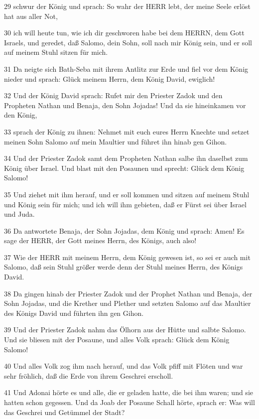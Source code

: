 \par 29 schwur der König und sprach: So wahr der HERR lebt, der meine Seele erlöst hat aus aller Not,
\par 30 ich will heute tun, wie ich dir geschworen habe bei dem HERRN, dem Gott Israels, und geredet, daß Salomo, dein Sohn, soll nach mir König sein, und er soll auf meinem Stuhl sitzen für mich.
\par 31 Da neigte sich Bath-Seba mit ihrem Antlitz zur Erde und fiel vor dem König nieder und sprach: Glück meinem Herrn, dem König David, ewiglich!
\par 32 Und der König David sprach: Rufet mir den Priester Zadok und den Propheten Nathan und Benaja, den Sohn Jojadas! Und da sie hineinkamen vor den König,
\par 33 sprach der König zu ihnen: Nehmet mit euch eures Herrn Knechte und setzet meinen Sohn Salomo auf mein Maultier und führet ihn hinab gen Gihon.
\par 34 Und der Priester Zadok samt dem Propheten Nathan salbe ihn daselbst zum König über Israel. Und blast mit den Posaunen und sprecht: Glück dem König Salomo!
\par 35 Und ziehet mit ihm herauf, und er soll kommen und sitzen auf meinem Stuhl und König sein für mich; und ich will ihm gebieten, daß er Fürst sei über Israel und Juda.
\par 36 Da antwortete Benaja, der Sohn Jojadas, dem König und sprach: Amen! Es sage der HERR, der Gott meines Herrn, des Königs, auch also!
\par 37 Wie der HERR mit meinem Herrn, dem König gewesen ist, so sei er auch mit Salomo, daß sein Stuhl größer werde denn der Stuhl meines Herrn, des Königs David.
\par 38 Da gingen hinab der Priester Zadok und der Prophet Nathan und Benaja, der Sohn Jojadas, und die Krether und Plether und setzten Salomo auf das Maultier des Königs David und führten ihn gen Gihon.
\par 39 Und der Priester Zadok nahm das Ölhorn aus der Hütte und salbte Salomo. Und sie bliesen mit der Posaune, und alles Volk sprach: Glück dem König Salomo!
\par 40 Und alles Volk zog ihm nach herauf, und das Volk pfiff mit Flöten und war sehr fröhlich, daß die Erde von ihrem Geschrei erscholl.
\par 41 Und Adonai hörte es und alle, die er geladen hatte, die bei ihm waren; und sie hatten schon gegessen. Und da Joab der Posaune Schall hörte, sprach er: Was will das Geschrei und Getümmel der Stadt?
